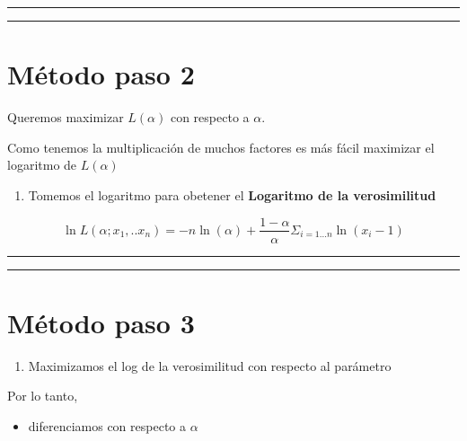 \documentclass[
]{book}
\providecommand{\tightlist}{%
  \setlength{\itemsep}{0pt}\setlength{\parskip}{0pt}}
\begin{document}
\begin{center}\rule{0.5\linewidth}{0.5pt}\end{center}

\begin{center}\rule{0.5\linewidth}{0.5pt}\end{center}

\hypertarget{muxe9todo-paso-2}{%
\section{Método paso 2}\label{muxe9todo-paso-2}}

Queremos maximizar \(L(\alpha)\) con respecto a \(\alpha\).

Como tenemos la multiplicación de muchos factores es más fácil maximizar el logaritmo de \(L(\alpha)\)

\begin{enumerate}
\def\labelenumi{\arabic{enumi}.}
\setcounter{enumi}{1}
\tightlist
\item
  Tomemos el logaritmo para obetener el \textbf{Logaritmo de la verosimilitud}
\end{enumerate}

\[\ln L(\alpha;x_1,..x_n)= -n \ln(\alpha) + {\frac{1-\alpha}{\alpha}} \Sigma_{i=1...n} \ln (x_i-1)\]

\begin{center}\rule{0.5\linewidth}{0.5pt}\end{center}

\begin{center}\rule{0.5\linewidth}{0.5pt}\end{center}

\hypertarget{muxe9todo-paso-3}{%
\section{Método paso 3}\label{muxe9todo-paso-3}}

\begin{enumerate}
\def\labelenumi{\arabic{enumi}.}
\setcounter{enumi}{2}
\tightlist
\item
  Maximizamos el log de la verosimilitud con respecto al parámetro
\end{enumerate}

Por lo tanto,

\begin{itemize}
\tightlist
\item
  diferenciamos con respecto a \(\alpha\)
\end{itemize}
\end{document}
